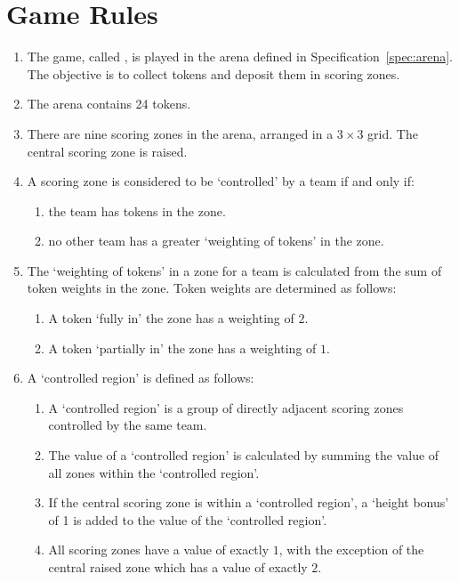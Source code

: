 \section{Game Rules}
\label{sec:rules}

\begin{enumerate}
  \item The game, called \emph{\gamename}, is played in the arena defined in
        Specification~\ref{spec:arena}. The objective is to collect tokens and
        deposit them in scoring zones.
  \item The arena contains 24 tokens.
  \item There are nine scoring zones in the arena, arranged in a $3\times3$
        grid. The central scoring zone is raised.
  \item A scoring zone is considered to be `controlled' by a team if and only if:
    \begin{enumerate}
      \item the team has tokens in the zone.
      \item no other team has a greater `weighting of tokens' in the zone.
    \end{enumerate}
  \item The `weighting of tokens' in a zone for a team is calculated from the sum of token weights in the zone.
      Token weights are determined as follows:
      \begin{enumerate}
            \item A token `fully in' the zone has a weighting of $2$.
            \item A token `partially in' the zone has a weighting of $1$.
    \end{enumerate}
  \item A `controlled region' is defined as follows:
    \begin{enumerate}
      \item A `controlled region' is a group of directly adjacent scoring zones controlled by the same team.
      \item The value of a `controlled region' is calculated by summing the value of all zones within the `controlled region'.
      \item If the central scoring zone is within a `controlled region', a `height bonus' of 1 is added to the value of the `controlled region'.
  \item All scoring zones have a value of exactly $1$, with the exception of the central raised zone which has a value of exactly $2$.
    \end{enumerate}

\end{enumerate}
